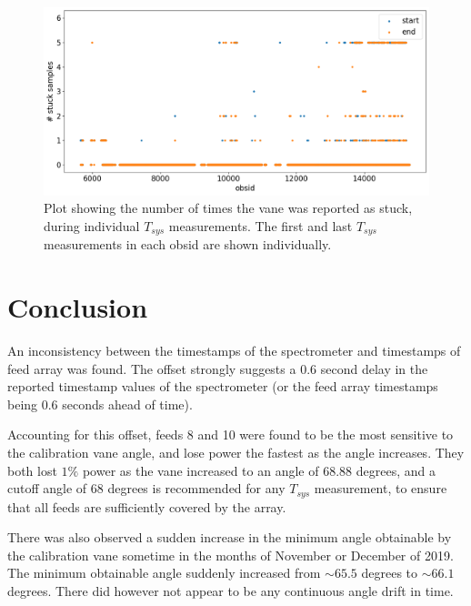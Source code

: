 \documentclass[10pt, a4paper]{article}
\begin{document}
\begin{figure}[H]
    \centering
    \includegraphics[scale=0.5]{../plots/n_stuck.png}
    \caption{Plot showing the number of times the vane was reported as stuck, during individual $T_{sys}$ measurements. The first and last $T_{sys}$ measurements in each obsid are shown individually.}
    \label{fig:n_stuck}
\end{figure}


\section{Conclusion}
An inconsistency between the timestamps of the spectrometer and timestamps of feed array was found. The offset strongly suggests a 0.6 second delay in the reported timestamp values of the spectrometer (or the feed array timestamps being 0.6 seconds ahead of time).

Accounting for this offset, feeds 8 and 10 were found to be the most sensitive to the calibration vane angle, and lose power the fastest as the angle increases. They both lost $1\%$ power as the vane increased to an angle of $68.88$ degrees, and a cutoff angle of $68$ degrees is recommended for any $T_{sys}$ measurement, to ensure that all feeds are sufficiently covered by the array.

There was also observed a sudden increase in the minimum angle obtainable by the calibration vane sometime in the months of November or December of 2019. The minimum obtainable angle suddenly increased from $\sim 65.5$ degrees to $\sim 66.1$ degrees. There did however not appear to be any continuous angle drift in time.
\end{document}
